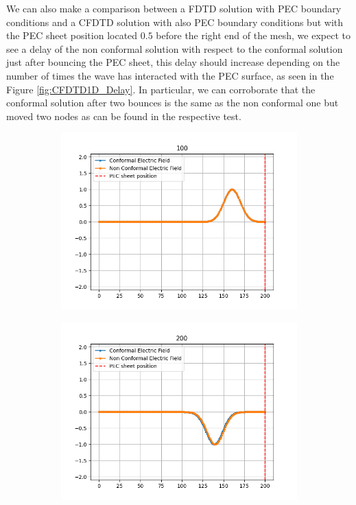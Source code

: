 \documentclass[12pt, oneside]{book}
\begin{document}
We can also make a comparison between a FDTD solution with PEC boundary conditions and a CFDTD solution with also PEC boundary conditions but with the PEC sheet position located $0.5$ before the right end of the mesh, we expect to see a delay of the non conformal solution with respect to the conformal solution just after bouncing the PEC sheet, this delay should increase depending on the number of times the wave has interacted with the PEC surface, as seen in the Figure \ref{fig:CFDTD1D_Delay}. In particular, we can corroborate that the conformal solution after two bounces is the same as the non conformal one but moved two nodes as can be found in the respective test. 

\begin{figure}[h!]
    \centering
    \begin{subfigure}[b]{0.49\textwidth}
        \centering
        \includegraphics[width=\textwidth]{Imagenes/CFDTD1D_Comparison1.png}
    \end{subfigure}
    \begin{subfigure}[b]{0.49\textwidth}
        \centering
        \includegraphics[width=\textwidth]{Imagenes/CFDTD1D_Comparison2.png}
    \end{subfigure}


\end{figure}
\end{document}
